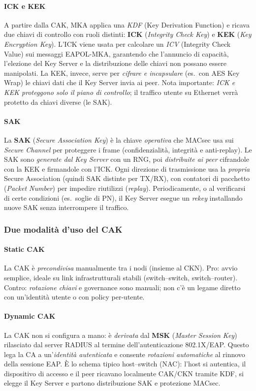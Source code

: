 \paragraph{ICK e KEK}
A partire dalla CAK, MKA applica una \emph{KDF} (Key Derivation Function) e ricava due chiavi di controllo con ruoli distinti: 
\textbf{ICK} (\emph{Integrity Check Key}) e \textbf{KEK} (\emph{Key Encryption Key}). 
L'ICK viene usata per calcolare un \emph{ICV} (Integrity Check Value) sui messaggi EAPOL-MKA, garantendo che l'annuncio di capacità, l'elezione del Key Server e la distribuzione delle chiavi non possano essere manipolati. 
La KEK, invece, serve per \emph{cifrare e incapsulare} (es.\ con AES Key Wrap) le chiavi dati che il Key Server invia ai peer. 
Nota importante: \emph{ICK e KEK proteggono solo il piano di controllo}; il traffico utente su Ethernet verrà protetto da chiavi diverse (le SAK).

\paragraph{SAK}
La \textbf{SAK} (\emph{Secure Association Key}) è la chiave \emph{operativa} che MACsec usa sui \emph{Secure Channel} per proteggere i frame (confidenzialità, integrità e anti-replay). 
Le SAK sono \emph{generate dal Key Server} con un RNG, poi \emph{distribuite ai peer} cifrandole con la KEK e firmandole con l'ICK. 
Ogni direzione di trasmissione usa la \emph{propria} Secure Association (quindi SAK distinte per TX/RX), con contatori di pacchetto (\emph{Packet Number}) per impedire riutilizzi (\emph{replay}). 
Periodicamente, o al verificarsi di certe condizioni (es.\ soglie di PN), il Key Server esegue un \emph{rekey} installando nuove SAK senza interrompere il traffico.

\subsubsection{Due modalità d'uso del CAK}
\paragraph{Static CAK}
La CAK è \emph{precondivisa} manualmente tra i nodi (insieme al CKN). 
Pro: avvio semplice, ideale su link infrastrutturali stabili (switch--switch, switch--router). 
Contro: \emph{rotazione chiavi} e governance sono manuali; non c'è un legame diretto con un'identità utente o con policy per-utente.

\paragraph{Dynamic CAK}
La CAK non si configura a mano: è \emph{derivata} dal \textbf{MSK} (\emph{Master Session Key}) rilasciato dal server RADIUS al termine dell'autenticazione 802.1X/EAP. 
Questo lega la CA a un'\emph{identità autenticata} e consente \emph{rotazioni automatiche} al rinnovo della sessione EAP. 
È lo schema tipico host--switch (NAC): l'host si autentica, il dispositivo di accesso e il peer ricavano localmente CAK/CKN tramite KDF, si elegge il Key Server e partono distribuzione SAK e protezione MACsec.


